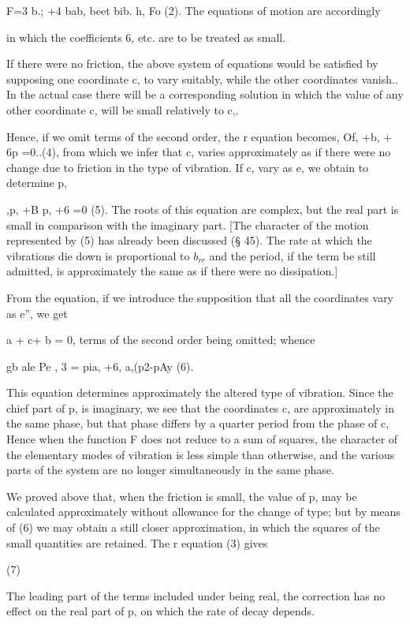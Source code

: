 F=3 b.; +4 bab, beet bib. h, Fo (2). The equations of motion are accordingly

in which the coefficients 6, etc. are to be treated as small.

If there were no friction, the above system of equations would be satisfied by
supposing one coordinate c, to vary suitably, while the other coordinates
vanish.. In the actual case there will be a corresponding solution in which the
value of any other coordinate c, will be small relatively to c,.

Hence, if we omit terms of the second order, the r equation becomes, Of, +b, +
6p =0..(4), from which we infer that c, varies approximately as if there were
no change due to friction in the type of vibration. If c, vary as e, we obtain
to determine p,

,p, +B p, +6 =0 (5). The roots of this equation are complex, but the real part
is small in comparison with the imaginary part.  [The character of the motion
represented by (5) has already been discussed (§ 45). The rate at which the
vibrations die down is proportional to \(b_{rr}\) and the period, if the term
be still admitted, is approximately the same as if there were no dissipation.]

From the equation, if we introduce the supposition that all the coordinates
vary as e'', we get

a + c+ b = 0, terms of the second order being omitted; whence

gb ale Pe , 3 = pia, +6, a,(p2-pAy (6).

This equation determines approximately the altered type of vibration.  Since
the chief part of p, is imaginary, we see that the coordinates c, are
approximately in the same phase, but that phase differs by a quarter period
from the phase of c, Hence when the function F does not reduce to a sum of
squares, the character of the elementary modes of vibration is less simple than
otherwise, and the various parts of the system are no longer simultaneously in
the same phase.

We proved above that, when the friction is small, the value of p, may be
calculated approximately without allowance for the change of type; but by means
of (6) we may obtain a still closer approximation, in which the squares of the
small quantities are retained. The r equation (3) gives

(7)

The leading part of the terms included under being real, the correction has no
effect on the real part of p, on which the rate of decay depends.

